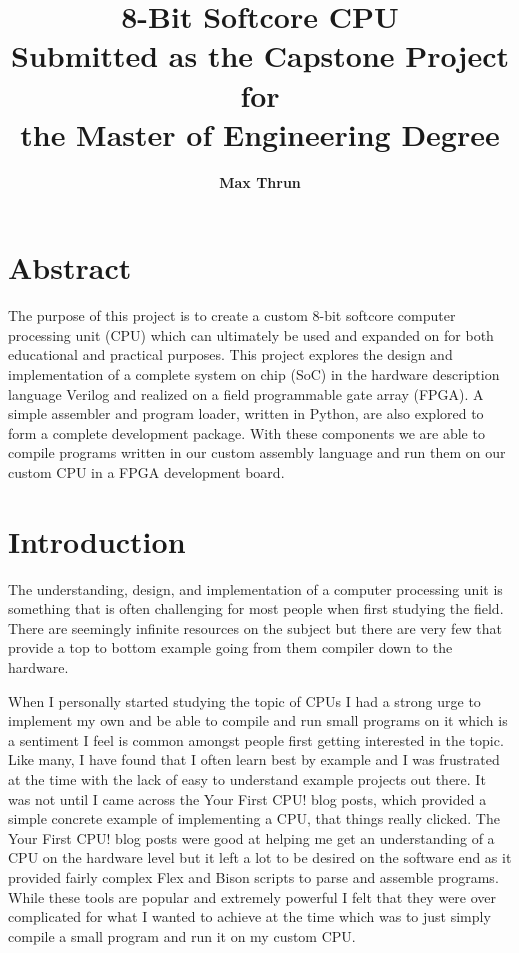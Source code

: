 \documentclass[10pt]{article}
\title{
    \vspace{0.5in}
    \textmd{\textbf{8-Bit Softcore CPU}}\\
    \vspace{2in}
    \textmd{\textbf{Submitted as the Capstone Project for\\the Master of Engineering Degree}}\\
    \vfill
}
\author{\textbf{Max Thrun}}
\begin{document}
\clearpage\maketitle
\thispagestyle{empty}
\newpage
\section{Abstract}

The purpose of this project is to create a custom 8-bit softcore computer
processing unit (CPU) which can ultimately be used and expanded on for both
educational and practical purposes. This project explores the design and
implementation of a complete system on chip (SoC) in the hardware description
language Verilog and realized on a field programmable gate array (FPGA). A
simple assembler and program loader, written in Python, are also explored to
form a complete development package. With these components we are able to
compile programs written in our custom assembly language and run them on our
custom CPU in a FPGA development board.

\section{Introduction}

The understanding, design, and implementation of a computer processing unit is
something that is often challenging for most people when first studying the
field. There are seemingly infinite resources on the subject but there are very
few that provide a top to bottom example going from them compiler down to the
hardware.

When I personally started studying the topic of CPUs I had a strong urge to
implement my own and be able to compile and run small programs on it which is a
sentiment I feel is common amongst people first getting interested in the
topic.  Like many, I have found that I often learn best by example and I was
frustrated at the time with the lack of easy to understand example projects out
there. It was not until I came across the Your First CPU! \cite{yfcpu} blog
posts, which provided a simple concrete example of implementing a CPU, that
things really clicked. The Your First CPU!  blog posts were good at helping me
get an understanding of a CPU on the hardware level but it left a lot to be
desired on the software end as it provided fairly complex Flex and Bison
\cite{flex} scripts to parse and assemble programs. While these tools are
popular and extremely powerful I felt that they were over complicated for what
I wanted to achieve at the time which was to just simply compile a small
program and run it on my custom CPU.
\end{document}
